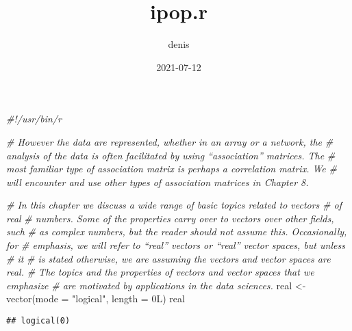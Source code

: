 \documentclass[
]{article}
\title{ipop.r}
\author{denis}
\date{2021-07-12}
\newenvironment{Shaded}{\begin{snugshade}}{\end{snugshade}}
\newcommand{\AttributeTok}[1]{\textcolor[rgb]{0.77,0.63,0.00}{#1}}
\newcommand{\CommentTok}[1]{\textcolor[rgb]{0.56,0.35,0.01}{\textit{#1}}}
\newcommand{\FunctionTok}[1]{\textcolor[rgb]{0.00,0.00,0.00}{#1}}
\newcommand{\NormalTok}[1]{#1}
\newcommand{\OtherTok}[1]{\textcolor[rgb]{0.56,0.35,0.01}{#1}}
\newcommand{\StringTok}[1]{\textcolor[rgb]{0.31,0.60,0.02}{#1}}
\begin{document}
\maketitle

\begin{Shaded}
\begin{Highlighting}[]
\CommentTok{\#!/usr/bin/r}

\CommentTok{\# However the data are represented, whether in an array or a network, the}
\CommentTok{\# analysis of the data is often facilitated by using “association” matrices. The}
\CommentTok{\# most familiar type of association matrix is perhaps a correlation matrix. We}
\CommentTok{\# will encounter and use other types of association matrices in Chapter 8.}

\CommentTok{\# In this chapter we discuss a wide range of basic topics related to vectors }
\CommentTok{\# of real}
\CommentTok{\# numbers. Some of the properties carry over to vectors over other fields, such}
\CommentTok{\# as complex numbers, but the reader should not assume this. Occasionally, for}
\CommentTok{\# emphasis, we will refer to “real” vectors or “real” vector spaces, but unless }
\CommentTok{\# it}
\CommentTok{\# is stated otherwise, we are assuming the vectors and vector spaces are real.}
\CommentTok{\# The topics and the properties of vectors and vector spaces that we emphasize}
\CommentTok{\# are motivated by applications in the data sciences.}
\NormalTok{real }\OtherTok{\textless{}{-}} \FunctionTok{vector}\NormalTok{(}\AttributeTok{mode =} \StringTok{"logical"}\NormalTok{, }\AttributeTok{length =}\NormalTok{ 0L)}
\NormalTok{real}
\end{Highlighting}
\end{Shaded}

\begin{verbatim}
## logical(0)
\end{verbatim}
\end{document}
